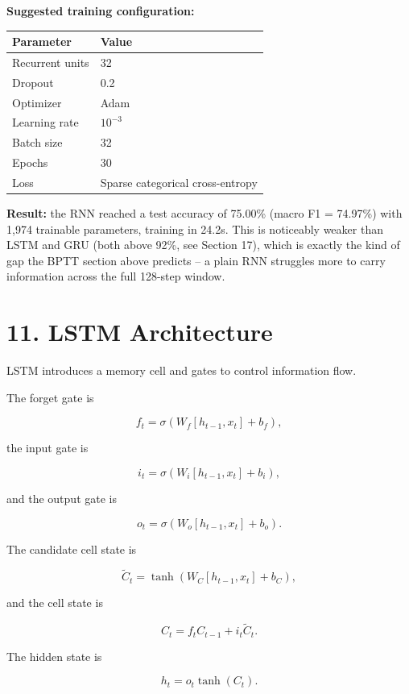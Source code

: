 \documentclass[10pt]{article}
\begin{document}
\textbf{Suggested training configuration:}

\begin{center}
\begin{tabular}{|l|l|}
\hline
Parameter & Value\\
\hline
Recurrent units & 32\\
Dropout & 0.2\\
Optimizer & Adam\\
Learning rate & $10^{-3}$\\
Batch size & 32\\
Epochs & 30\\
Loss & Sparse categorical cross-entropy\\
\hline
\end{tabular}
\end{center}

\textbf{Result:} the RNN reached a test accuracy of 75.00\% (macro F1 =
74.97\%) with 1,974 trainable parameters, training in 24.2s. This is
noticeably weaker than LSTM and GRU (both above 92\%, see Section 17), which
is exactly the kind of gap the BPTT section above predicts -- a plain RNN
struggles more to carry information across the full 128-step window.

\section*{11. LSTM Architecture}

LSTM introduces a memory cell and gates to control information flow.

The forget gate is

\[
f_t=\sigma(W_f[h_{t-1},x_t]+b_f),
\]

the input gate is

\[
i_t=\sigma(W_i[h_{t-1},x_t]+b_i),
\]

and the output gate is

\[
o_t=\sigma(W_o[h_{t-1},x_t]+b_o).
\]

The candidate cell state is

\[
\tilde{C}_t=
\tanh(W_C[h_{t-1},x_t]+b_C),
\]

and the cell state is

\[
C_t=f_tC_{t-1}+i_t\tilde{C}_t.
\]

The hidden state is

\[
h_t=o_t\tanh(C_t).
\]

\begin{center}
\end{center}
\end{document}
